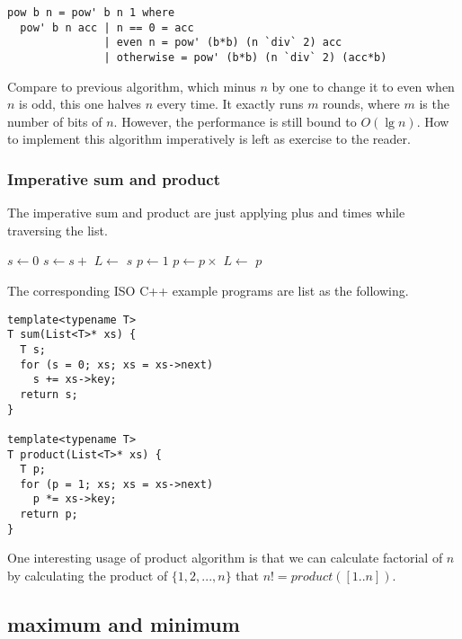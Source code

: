 \documentclass[UTF8]{article}
\begin{document}
\lstset{language=Haskell}
\begin{lstlisting}
pow b n = pow' b n 1 where
  pow' b n acc | n == 0 = acc
               | even n = pow' (b*b) (n `div` 2) acc
               | otherwise = pow' (b*b) (n `div` 2) (acc*b)
\end{lstlisting}

Compare to previous algorithm, which minus $n$ by one to change it to even when $n$ is odd, this one halves $n$ every
time. It exactly runs $m$ rounds, where $m$ is the number of bits of $n$. However, the performance is still bound to
$O(\lg n)$. How to implement this algorithm imperatively is left as exercise to the reader.

\subsubsection{Imperative sum and product}
The imperative sum and product are just applying plus and times while traversing the list.

\begin{algorithmic}[1]
  \State $s \gets 0$
    \State $s \gets s +$ 
    \State $L \gets$ 
  \EndWhile
  \State \Return $s$
\EndFunction
\Statex
{}
  \State $p \gets 1$
    \State $p \gets p \times $ 
    \State $L \gets$ 
  \EndWhile
  \State \Return $p$
\EndFunction
\end{algorithmic}

The corresponding ISO C++ example programs are list as the following.

\lstset{language=C++}
\begin{lstlisting}
template<typename T>
T sum(List<T>* xs) {
  T s;
  for (s = 0; xs; xs = xs->next)
    s += xs->key;
  return s;
}

template<typename T>
T product(List<T>* xs) {
  T p;
  for (p = 1; xs; xs = xs->next)
    p *= xs->key;
  return p;
}
\end{lstlisting}

One interesting usage of product algorithm is that we can calculate factorial of $n$ by calculating the
product of $\{1, 2, ..., n\}$ that $n! = product([1..n])$.

\subsection{maximum and minimum}
\end{document}
